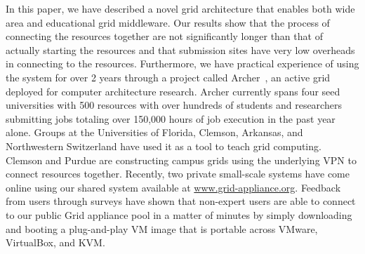 \documentclass[conference]{IEEEtran}
\begin{document}
In this paper, we have described a novel grid architecture that enables both
wide area and educational grid middleware.  Our results show that the process
of connecting the resources together are not significantly longer than that of
actually starting the resources and that submission sites have very low
overheads in connecting to the resources.  Furthermore, we have practical
experience of using the system for over 2 years through a project called
Archer~\cite{archer}, an active grid deployed for computer architecture
research.  Archer currently spans four seed universities with 500 resources
with over hundreds of students and researchers submitting jobs totaling over
150,000 hours of job execution in the past year alone.  Groups at the
Universities of Florida, Clemson, Arkansas, and Northwestern Switzerland have
used it as a tool to teach grid computing.  Clemson and Purdue are constructing
campus grids using the underlying VPN to connect resources together.  Recently,
two private small-scale systems have come online using our shared system
available at \url{www.grid-appliance.org}.  Feedback from users through surveys
have shown that non-expert users are able to connect to our public Grid
appliance pool in a matter of minutes by simply downloading and booting a
plug-and-play VM image that is portable across VMware, VirtualBox, and KVM.



\end{document}

